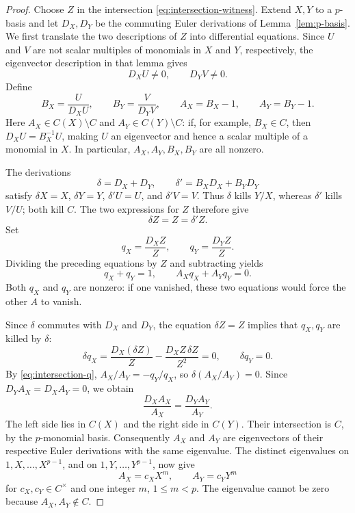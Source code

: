 \begin{proof}
Choose $Z$ in the intersection \eqref{eq:intersection-witness}.  Extend
$X,Y$ to a $p$-basis and let $D_X,D_Y$ be the commuting Euler derivations
of Lemma~\ref{lem:p-basis}.  We first translate the two descriptions of $Z$
into differential equations.  Since $U$ and $V$ are not scalar multiples
of monomials in $X$ and $Y$, respectively, the eigenvector description in
that lemma gives
\[
 D_XU\ne0,\qquad D_YV\ne0.
\]
Define
\[
 B_X=\frac{U}{D_XU},\qquad B_Y=\frac{V}{D_YV},
 \qquad A_X=B_X-1,\qquad A_Y=B_Y-1.
\]
Here $A_X\in C(X)\setminus C$ and $A_Y\in C(Y)\setminus C$:
if, for example, $B_X\in C$, then $D_XU=B_X^{-1}U$, making $U$
an eigenvector and hence a scalar multiple of a monomial in $X$.
In particular, $A_X,A_Y,B_X,B_Y$ are all nonzero.

The derivations
\[
 \delta=D_X+D_Y,
 \qquad \delta'=B_XD_X+B_YD_Y
\]
satisfy $\delta X=X$, $\delta Y=Y$, $\delta'U=U$, and $\delta'V=V$.
Thus $\delta$ kills $Y/X$, whereas $\delta'$ kills $V/U$; both kill $C$.
The two expressions for $Z$ therefore give
\[
 \delta Z=Z=\delta'Z.
\]
Set
\[
 q_X=\frac{D_XZ}{Z},\qquad q_Y=\frac{D_YZ}{Z}.
\]
Dividing the preceding equations by $Z$ and subtracting yields
\begin{equation}
\label{eq:intersection-q}
 q_X+q_Y=1,\qquad A_Xq_X+A_Yq_Y=0.
\end{equation}
Both $q_X$ and $q_Y$ are nonzero: if one vanished, these two equations
would force the other $A$ to vanish.

Since $\delta$ commutes with $D_X$ and $D_Y$, the equation $\delta Z=Z$
implies that $q_X,q_Y$ are killed by $\delta$:
\[
 \delta q_X=\frac{D_X(\delta Z)}{Z}
              -\frac{D_XZ\,\delta Z}{Z^2}=0,
 \qquad \delta q_Y=0.
\]
By \eqref{eq:intersection-q}, $A_X/A_Y=-q_Y/q_X$, so
$\delta(A_X/A_Y)=0$.  Since $D_YA_X=D_XA_Y=0$, we obtain
\begin{equation}
\label{eq:intersection-eigenvalue}
 \frac{D_XA_X}{A_X}=\frac{D_YA_Y}{A_Y}.
\end{equation}
The left side lies in $C(X)$ and the right side in $C(Y)$.
Their intersection is $C$, by the $p$-monomial basis.  Consequently
$A_X$ and $A_Y$ are eigenvectors of their respective Euler derivations
with the same eigenvalue.  The distinct eigenvalues on
$1,X,\ldots,X^{p-1}$, and on $1,Y,\ldots,Y^{p-1}$, now give
\begin{equation}
\label{eq:intersection-monomials}
 A_X=c_XX^m,\qquad A_Y=c_YY^m
\end{equation}
for $c_X,c_Y\in C^\times$ and one integer $m$, $1\le m<p$.
The eigenvalue cannot be zero because $A_X,A_Y\notin C$.


\end{proof}
